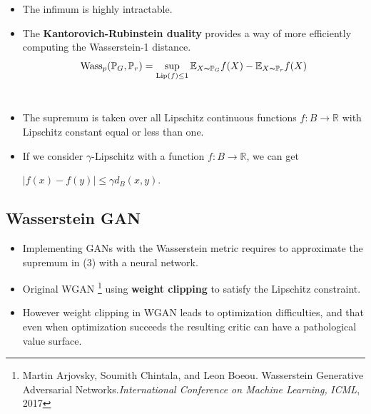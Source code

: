 \documentclass[landscape,headrule,footrule]{foils}
\begin{document}
\begin{frame}
\begin{flushleft}
\begin{itemize}
\item The infimum is highly intractable.\\
\item The \textbf{Kantorovich-Rubinstein duality} provides a way of more efficiently computing the Wasserstein-1 distance.
\begin{equation}
{\rm Wass}_p(\mathbb{P}_{G},\mathbb{P}_{r})= \mathop{\sup}_{{\rm Lip}(f)\leq 1} \mathbb{E}_{X\thicksim \mathbb{P}_{G}}f(X)- \mathbb{E}_{X\thicksim \mathbb{P}_{r}}f(X)
\end{equation}
\\
\item The supremum is taken over all Lipschitz continuous functions $f:B\rightarrow \mathbb{R}$ with Lipschitz constant equal or less than one.\\
\item If we consider $\gamma$-Lipschitz with a function $f:B\rightarrow \mathbb{R}$, we can get
\begin{center}
	$|f(x)-f(y)| \leq \gamma d_B(x,y)$.
\end{center}
\end{itemize}
\end{flushleft}
\end{frame}

\subsection{Wasserstein GAN}
\tableofcontents
\begin{frame}
\begin{flushleft}
\begin{itemize}
\item Implementing GANs with the Wasserstein metric requires to approximate the supremum in (3) with a neural network.
\\
\item Original WGAN \footnote{Martin Arjovsky, Soumith Chintala, and Leon Boeou. Wasserstein Generative Adversarial Networks.\textit{International Conference on Machine Learning,} \textsl{ICML}, 2017} using \textbf{weight clipping} to satisfy the Lipschitz constraint.
\\
\item However weight clipping in WGAN leads to optimization difficulties, and that even when optimization succeeds the resulting critic can have a pathological value surface.
\end{itemize}
\end{flushleft}
\end{frame}
\end{document}
